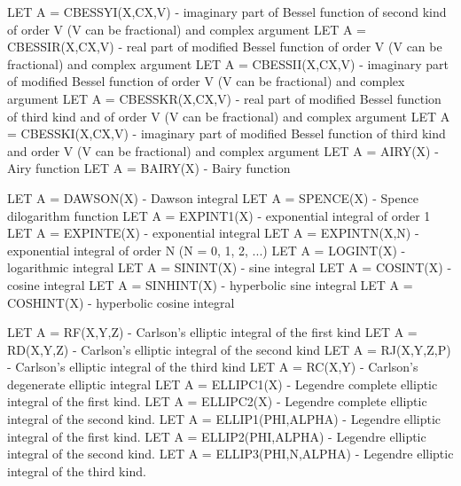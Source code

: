 {       LET A = CBESSYI(X,CX,V)     - imaginary part of Bessel function
                                     of second kind of order V (V can be
                                     fractional) and complex argument
       LET A = CBESSIR(X,CX,V)     - real part of modified Bessel function
                                     of order V (V can be fractional) and
                                     complex argument
       LET A = CBESSII(X,CX,V)     - imaginary part of modified Bessel
                                     function of order V (V can be
                                     fractional) and complex argument
       LET A = CBESSKR(X,CX,V)     - real part of modified Bessel function
                                     of third kind and of order V (V can
                                     be fractional) and complex argument
       LET A = CBESSKI(X,CX,V)     - imaginary part of modified Bessel
                                     function of third kind and order V
                                     (V can be fractional) and complex
                                     argument
       LET A = AIRY(X)             - Airy function
       LET A = BAIRY(X)            - Bairy function

       LET A = DAWSON(X)           - Dawson integral
       LET A = SPENCE(X)           - Spence dilogarithm function
       LET A = EXPINT1(X)          - exponential integral of order 1
       LET A = EXPINTE(X)          - exponential integral
       LET A = EXPINTN(X,N)        - exponential integral of order N 
                                     (N = 0, 1, 2, ...)
       LET A = LOGINT(X)           - logarithmic integral
       LET A = SININT(X)           - sine integral
       LET A = COSINT(X)           - cosine integral
       LET A = SINHINT(X)          - hyperbolic sine integral
       LET A = COSHINT(X)          - hyperbolic cosine integral

       LET A = RF(X,Y,Z)           - Carlson's elliptic integral of the
                                     first kind
       LET A = RD(X,Y,Z)           - Carlson's elliptic integral of the
                                     second kind
       LET A = RJ(X,Y,Z,P)         - Carlson's elliptic integral of the
                                     third kind
       LET A = RC(X,Y)             - Carlson's degenerate elliptic
                                     integral
       LET A = ELLIPC1(X)          - Legendre complete elliptic
                                     integral of the first kind. 
       LET A = ELLIPC2(X)          - Legendre complete elliptic
                                     integral of the second kind. 
       LET A = ELLIP1(PHI,ALPHA)   - Legendre elliptic integral of the
                                     first kind. 
       LET A = ELLIP2(PHI,ALPHA)   - Legendre elliptic integral of the
                                     second kind. 
       LET A = ELLIP3(PHI,N,ALPHA) - Legendre elliptic integral of the
                                     third kind. 

}
